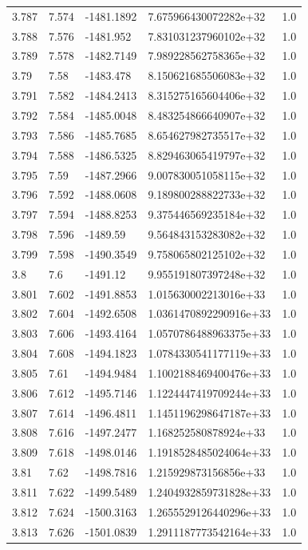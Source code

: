 \begin{tabular}{lllll}
3.787 & 7.574 & -1481.1892 & 7.675966430072282e+32 & 1.0 \\
3.788 & 7.576 & -1481.952 & 7.831031237960102e+32 & 1.0 \\
3.789 & 7.578 & -1482.7149 & 7.989228562758365e+32 & 1.0 \\
3.79 & 7.58 & -1483.478 & 8.150621685506083e+32 & 1.0 \\
3.791 & 7.582 & -1484.2413 & 8.315275165604406e+32 & 1.0 \\
3.792 & 7.584 & -1485.0048 & 8.483254866640907e+32 & 1.0 \\
3.793 & 7.586 & -1485.7685 & 8.654627982735517e+32 & 1.0 \\
3.794 & 7.588 & -1486.5325 & 8.829463065419797e+32 & 1.0 \\
3.795 & 7.59 & -1487.2966 & 9.007830051058115e+32 & 1.0 \\
3.796 & 7.592 & -1488.0608 & 9.189800288822733e+32 & 1.0 \\
3.797 & 7.594 & -1488.8253 & 9.375446569235184e+32 & 1.0 \\
3.798 & 7.596 & -1489.59 & 9.564843153283082e+32 & 1.0 \\
3.799 & 7.598 & -1490.3549 & 9.758065802125102e+32 & 1.0 \\
3.8 & 7.6 & -1491.12 & 9.955191807397248e+32 & 1.0 \\
3.801 & 7.602 & -1491.8853 & 1.015630002213016e+33 & 1.0 \\
3.802 & 7.604 & -1492.6508 & 1.0361470892290916e+33 & 1.0 \\
3.803 & 7.606 & -1493.4164 & 1.0570786488963375e+33 & 1.0 \\
3.804 & 7.608 & -1494.1823 & 1.0784330541177119e+33 & 1.0 \\
3.805 & 7.61 & -1494.9484 & 1.1002188469400476e+33 & 1.0 \\
3.806 & 7.612 & -1495.7146 & 1.1224447419709244e+33 & 1.0 \\
3.807 & 7.614 & -1496.4811 & 1.1451196298647187e+33 & 1.0 \\
3.808 & 7.616 & -1497.2477 & 1.168252580878924e+33 & 1.0 \\
3.809 & 7.618 & -1498.0146 & 1.1918528485024064e+33 & 1.0 \\
3.81 & 7.62 & -1498.7816 & 1.215929873156856e+33 & 1.0 \\
3.811 & 7.622 & -1499.5489 & 1.2404932859731828e+33 & 1.0 \\
3.812 & 7.624 & -1500.3163 & 1.2655529126440296e+33 & 1.0 \\
3.813 & 7.626 & -1501.0839 & 1.2911187773542164e+33 & 1.0 \\

\end{tabular}

